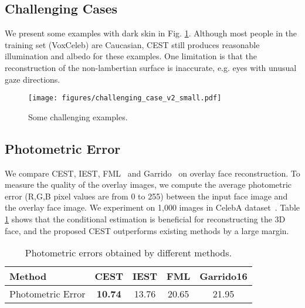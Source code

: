 \begin{appendix}
\subsection{Challenging Cases}
We present some examples with dark skin in Fig. \ref{fig:hard_examples}. Although most people in the training set (VoxCeleb) are Caucasian, CEST still produces reasonable illumination and albedo for these examples. One limitation is that the reconstruction of the non-lambertian surface is inaccurate, e.g. eyes with unusual gaze directions.
\begin{figure}[ht]
  \centering
\renewcommand{\captionlabelfont}{\footnotesize}
  \texttt{[image: figures/challenging\_case\_v2\_small.pdf]}
  \caption{\footnotesize Some challenging examples.}\label{fig:hard_examples}
\end{figure}


\subsection{Photometric Error}
\label{morequantitative}

We compare CEST, IEST, FML~\cite{tewari2019fml} and Garrido~\cite{garrido2016corrective} on overlay face reconstruction. To measure the quality of the overlay images, we compute the average photometric error (R,G,B pixel values are from 0 to 255) between the input face image and the overlay face image. We experiment on 1,000 images in CelebA dataset~\cite{liu2015deep}. Table \ref{overlay} shows that the conditional estimation is beneficial for reconstructing the 3D face, and the proposed CEST outperforms existing methods by a large margin.


\begin{table}[h]
\renewcommand{\captionlabelfont}{\footnotesize}
\setlength{\abovecaptionskip}{2pt}
\footnotesize
\centering
\begin{tabular}{l|c|c|c|c}
\hline
Method & \textbf{CEST} & IEST & FML \cite{tewari2019fml} & Garrido16 \cite{garrido2016corrective} \\
\hline
Photometric Error & \textbf{10.74} & 13.76 & 20.65 & 21.95 \\
\hline
\end{tabular}
\caption{\footnotesize Photometric errors obtained by different methods.}\label{overlay}
\end{table}

\end{appendix}
